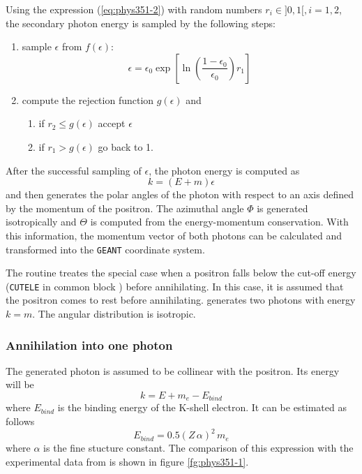 Using the expression (\ref{eq:phys351-2}) with random numbers
$r_i \in ]0,1[, i=1,2$, the secondary photon energy is sampled by
the following steps:
\begin{enumerate}
\item sample $\epsilon$ from $f(\epsilon)$:
\begin{equation}
\epsilon =\epsilon_0 \exp  \left[ \ln \left(\frac{1- \epsilon_0}
{\epsilon_0}
          \right)  r_1  \right]
\end{equation}
\item
compute the rejection function $g(\epsilon)$ and
\begin{enumerate}
\item if $r_2 \leq g(\epsilon)$   accept $\epsilon$
\item if $r_1 > g(\epsilon)$  go back to 1.
\end{enumerate}
\end{enumerate}
After the successful sampling of $\epsilon$, the photon energy is computed as
 \begin{equation}
k = (E+m)\epsilon
\end{equation}
and then  generates the polar angles of the photon with respect
to an axis defined by the momentum of the positron. The azimuthal angle
$\Phi$ is generated isotropically and $\Theta$ is computed from the
energy-momentum conservation. With this information, the momentum
vector of both photons can be calculated and transformed into the {\tt GEANT}
coordinate system.
 
The routine  treates the special case when a positron falls
below the cut-off energy ({\tt CUTELE} in 
common block ) before annihilating.
In this case, it is assumed that the positron comes to rest before annihilating.
 generates two photons with energy $k=m$. The
angular distribution is isotropic.
\subsubsection{Annihilation into one photon}
The generated photon is assumed to be collinear with the positron.
Its energy will be
\begin{equation}
k = E + m_e - E_{bind}
\end{equation}
where $E_{bind}$ is the binding energy of the K-shell electron.
It can be estimated as follows
\begin{equation}
\label{eq:phys315-1}
E_{bind} = 0.5 (Z \, \alpha )^2  \, m_e
\end{equation}
where $\alpha$ is the fine stucture constant. The comparison
of this expression with the experimental data from
\cite{bib-XRAY} is shown in figure \ref{fg:phys351-1}.

